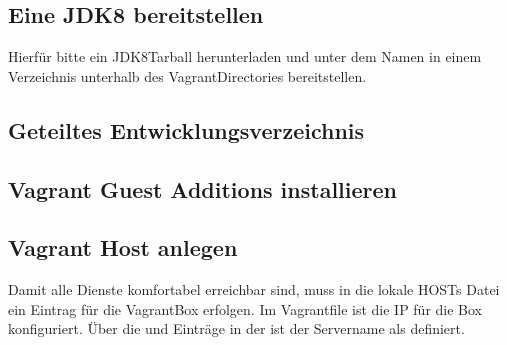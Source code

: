 \documentclass[letterpaper,10pt,english]{sphinxmanual}
\begin{document}
\subsection{Eine JDK8 bereitstellen}
\label{\detokenize{toscience:eine-jdk8-bereitstellen}}\label{\detokenize{toscience:id51}}
\sphinxAtStartPar
Hierfür bitte ein JDK8\sphinxhyphen{}Tarball herunterladen und unter dem Namen
 in einem Verzeichnis  unterhalb des
Vagrant\sphinxhyphen{}Directories bereitstellen.

\begin{sphinxVerbatim}[commandchars=\\\{\}]
 
  
\end{sphinxVerbatim}


\subsection{Geteiltes Entwicklungsverzeichnis}
\label{\detokenize{toscience:geteiltes-entwicklungsverzeichnis}}\label{\detokenize{toscience:id52}}
\begin{sphinxVerbatim}[commandchars=\\\{\}]
 
\end{sphinxVerbatim}


\subsection{Vagrant Guest Additions installieren}
\label{\detokenize{toscience:vagrant-guest-additions-installieren}}\label{\detokenize{toscience:id53}}
\begin{sphinxVerbatim}[commandchars=\\\{\}]
      
\end{sphinxVerbatim}


\subsection{Vagrant Host anlegen}
\label{\detokenize{toscience:vagrant-host-anlegen}}\label{\detokenize{toscience:id54}}
\sphinxAtStartPar
Damit alle Dienste komfortabel erreichbar sind, muss in die lokale HOSTs
Datei ein Eintrag für die Vagrant\sphinxhyphen{}Box erfolgen. Im Vagrantfile ist die
IP  für die Box konfiguriert. Über die  und
 Einträge in der  ist der Servername als
 definiert.
\end{document}
